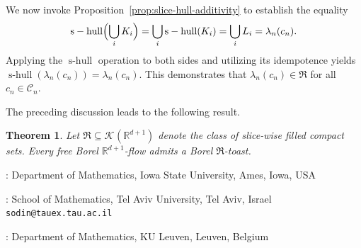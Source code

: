 \documentclass[12pt]{paper}
\numberwithin{equation}{section}
\theoremstyle{plain}
\newtheorem{theorem}{Theorem}[section]
\theoremstyle{definition}
\newcommand{\R}{\mathbb{R}}
\newcommand{\mfR}{\mathfrak{R}}
\newcommand{\vietoris}[2][]{\mathcal{K}_{#1}(#2)}
\DeclareMathOperator{\shull}{\mathrm{s-hull}}
\begin{document}
We now invoke Proposition~\ref{prop:slice-hull-additivity} to establish the equality
\[\shull\Bigl(\bigcup_{i}K_{i}\Bigr) = \bigcup_{i}\shull(K_{i}) = \bigcup_{i}L_{i} =
  \lambda_{n}(c_{n}).\]
Applying the \(\shull\) operation to both sides and utilizing its idempotence yields
\(\shull(\lambda_{n}(c_{n})) = \lambda_{n}(c_{n})\). This demonstrates that
\(\lambda_{n}(c_{n}) \in \mfR\) for all \(c_{n} \in \mathcal{C}_{n}\).

The preceding discussion leads to the following result.

\begin{theorem}
\label{thm:existence-of-slice-filled-toasts}
Let \(\mfR \subseteq \vietoris{\R^{d+1}}\) denote the class of slice-wise filled compact sets. Every
free Borel \(\R^{d+1}\)-flow admits a Borel \(\mfR\)-toast.
\end{theorem}






\bigskip
\bigskip

: Department of Mathematics, Iowa State University, Ames, Iowa, USA

\bigskip


: School of Mathematics, Tel Aviv University, Tel Aviv, Israel \newline
{\tt sodin@tauex.tau.ac.il}

\bigskip

: Department of Mathematics, KU Leuven, Leuven, Belgium 
\end{document}
